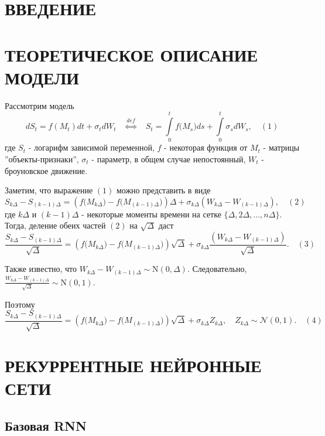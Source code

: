 



\section{ВВЕДЕНИЕ}

\section{ТЕОРЕТИЧЕСКОЕ ОПИСАНИЕ МОДЕЛИ}

Рассмотрим модель
\[
d S_t = f \left( M_t \right) dt + \sigma_t d W_t \quad \overset{def}{\Leftrightarrow} \quad S_t = \int\limits_0^t f \big( M_s \big) ds + \int\limits_0^t \sigma_s d W_s, \quad (1)
\]
где $S_t$ - логарифм зависимой переменной, $f$ - некоторая функция от $M_t$ - матрицы ''объекты-признаки'', $\sigma_t$ - параметр, в общем случае непостоянный, $W_t$ - броуновское движение.

Заметим, что выражение $(1)$ можно представить в виде
\[
S_{k \Delta} - S_{(k - 1) \Delta} = \left( f \big( M_{k \Delta}  \big) - f \big( M_{(k - 1) \Delta} \big) \right) \Delta + \sigma_{k \Delta} \left(W_{k \Delta} - W_{(k - 1) \Delta} \right), \quad (2)
\]
где $k \Delta$ и $(k - 1) \Delta$ - некоторые моменты времени на сетке $\{\Delta, 2 \Delta, ... , n \Delta\}$. Тогда, деление обеих частей $(2)$ на $\sqrt{\Delta}$ даст
\[
\frac{ S_{k \Delta} - S_{(k - 1) \Delta}}{\sqrt{\Delta}} = \left( f \big( M_{k \Delta} \big) - f \big( M_{(k - 1) \Delta} \big) \right) \sqrt{\Delta} +  \sigma_{k \Delta} \frac{\left( W_{k \Delta} - W_{(k - 1) \Delta} \right)}{\sqrt{\Delta}}. \quad (3)
\]

Также известно, что $ W_{k \Delta} - W_{(k - 1) \Delta} \sim \mathrm{N} (0, \Delta).$ Следовательно,  $\frac{W_{k \Delta} - W_{(k - 1) \Delta}}{\sqrt{\Delta}} \sim \mathrm{N}(0, 1)$.

Поэтому
\[
\frac{ S_{k \Delta} - S_{(k - 1) \Delta}}{\sqrt{\Delta}} = \left( f \big( M_{k \Delta} \big) - f \big( M_{(k - 1) \Delta} \big) \right) \sqrt{\Delta} +  \sigma_{k \Delta} Z_{k \Delta}, \quad Z_{k \Delta} \sim \mathcal{N}(0, 1). \quad (4)
\]

\section{РЕКУРРЕНТНЫЕ НЕЙРОННЫЕ СЕТИ}

\subsection{Базовая RNN}

